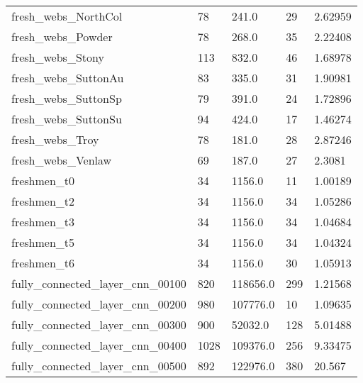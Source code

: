 \begin{longtable}{lllll}
 fresh\_webs\_NorthCol                                & 78         & 241.0       & 29    & 2.62959    \\
 fresh\_webs\_Powder                                  & 78         & 268.0       & 35    & 2.22408    \\
 fresh\_webs\_Stony                                   & 113        & 832.0       & 46    & 1.68978    \\
 fresh\_webs\_SuttonAu                                & 83         & 335.0       & 31    & 1.90981    \\
 fresh\_webs\_SuttonSp                                & 79         & 391.0       & 24    & 1.72896    \\
 fresh\_webs\_SuttonSu                                & 94         & 424.0       & 17    & 1.46274    \\
 fresh\_webs\_Troy                                    & 78         & 181.0       & 28    & 2.87246    \\
 fresh\_webs\_Venlaw                                  & 69         & 187.0       & 27    & 2.3081     \\
 freshmen\_t0                                        & 34         & 1156.0      & 11    & 1.00189    \\
 freshmen\_t2                                        & 34         & 1156.0      & 34    & 1.05286    \\
 freshmen\_t3                                        & 34         & 1156.0      & 34    & 1.04684    \\
 freshmen\_t5                                        & 34         & 1156.0      & 34    & 1.04324    \\
 freshmen\_t6                                        & 34         & 1156.0      & 30    & 1.05913    \\
 fully\_connected\_layer\_cnn\_00100                    & 820        & 118656.0    & 299   & 1.21568    \\
 fully\_connected\_layer\_cnn\_00200                    & 980        & 107776.0    & 10    & 1.09635    \\
 fully\_connected\_layer\_cnn\_00300                    & 900        & 52032.0     & 128   & 5.01488    \\
 fully\_connected\_layer\_cnn\_00400                    & 1028       & 109376.0    & 256   & 9.33475    \\
 fully\_connected\_layer\_cnn\_00500                    & 892        & 122976.0    & 380   & 20.567     \\

\end{longtable}

